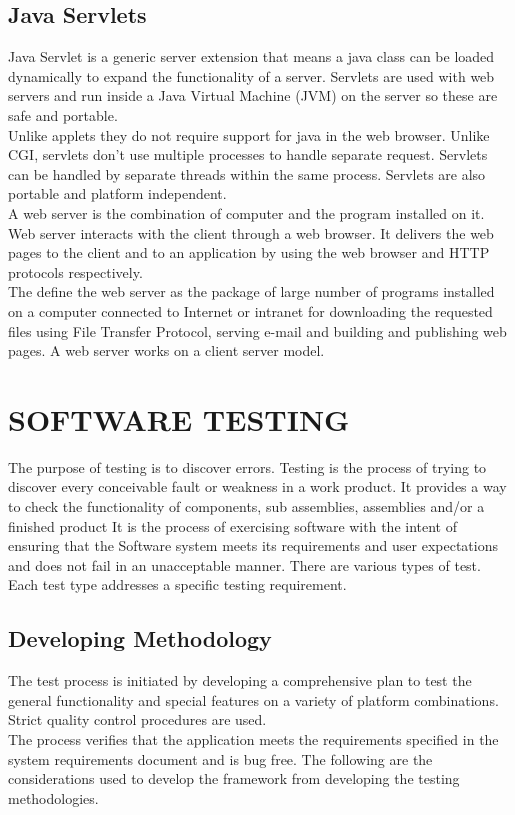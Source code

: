 \documentclass[BTech]{srmuthesis}
\begin{document}
\section{Java Servlets}
Java Servlet is a generic server extension that means a java class can be loaded dynamically to expand the functionality of a server. Servlets are used with web servers and run inside a Java Virtual Machine (JVM) on the server so these are safe and portable. \\
Unlike applets they do not require support for java in the web browser. Unlike CGI, servlets don't use multiple processes to handle separate request. Servlets can be handled by separate threads within the same process. Servlets are also portable and platform independent.\\
A web server is the combination of computer and the program installed on it. Web server interacts with the client through a web browser. It delivers the web pages to the client and to an application by using the web browser and HTTP protocols respectively. \\
The define the web server as the package of  large number of programs installed on a computer connected to Internet or intranet for downloading the requested files using File Transfer Protocol, serving e-mail and building and publishing web pages. A web server works on a client server model.\\

\chapter{SOFTWARE TESTING}
The purpose of testing is to discover errors. Testing is the process of trying to discover every conceivable fault or weakness in a work product. It provides a way to check the functionality of components, sub assemblies, assemblies and/or a finished product It is the process of exercising software with the intent of ensuring that the Software system meets its requirements and user expectations and does not fail in an unacceptable manner. There are various types of test. Each test type addresses a specific testing requirement.
\section{Developing Methodology}
The test process is initiated by developing a comprehensive plan to test the general functionality and special features on a variety of platform combinations. Strict quality control procedures are used.\\
The process verifies that the application meets the requirements specified in the system requirements document and is bug free. The following are the considerations used to develop the framework from developing the testing methodologies.
\end{document}
